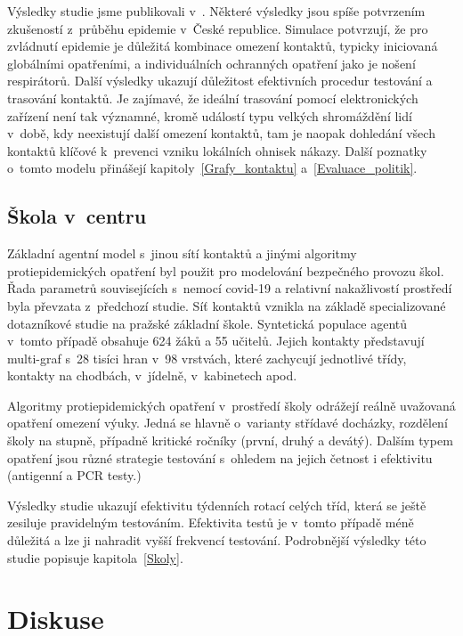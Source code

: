 Výsledky studie jsme publikovali v~\cite{M-techrep2021}. Některé výsledky jsou spíše potvrzením zkušeností z~průběhu epidemie v~České republice. Simulace potvrzují, že pro zvládnutí epidemie je důležitá kombinace omezení kontaktů, typicky iniciovaná globálními opatřeními, a individuálních ochranných opatření jako je nošení respirátorů. Další výsledky ukazují důležitost efektivních procedur testování a trasování kontaktů. Je zajímavé, že ideální trasování pomocí elektronických zařízení není tak významné, kromě událostí typu velkých shromáždění lidí v~době, kdy neexistují další omezení kontaktů, tam je naopak dohledání všech kontaktů klíčové k~prevenci vzniku lokálních ohnisek nákazy. Další poznatky o~tomto modelu přinášejí kapitoly~\ref{Grafy_kontaktu}
a~\ref{Evaluace_politik}.


\subsection*{Škola v~centru}

Základní agentní model s~jinou sítí kontaktů a jinými algoritmy protiepidemických opatření byl použit pro modelování bezpečného provozu škol. Řada parametrů souvisejících s~nemocí covid-19 a relativní nakažlivostí prostředí byla převzata z~před\-cho\-zí studie. Síť kontaktů vznikla na základě specializované dotazníkové studie na pražské základní škole. Syntetická populace agentů v~tomto případě obsahuje 624 žáků a 55 učitelů. Jejich kontakty představují multi-graf s~28 tisíci hran v~98 vrstvách, které zachycují jednotlivé třídy, kontakty na chodbách, v~jídelně, v~kabinetech apod. 

Algoritmy protiepidemických opatření v~prostředí školy odrážejí reálně uvažovaná opatření omezení výuky. Jedná se hlavně o~varianty střídavé docházky, rozdělení školy na stupně, případně kritické ročníky (první, druhý a devátý). Dalším typem opatření jsou různé strategie testování s~ohledem na jejich četnost i efektivitu (antigenní a PCR testy.)

Výsledky studie ukazují efektivitu týdenních rotací celých tříd, která se ještě zesiluje pravidelným testováním. Efektivita testů je v~tomto případě méně důležitá a lze ji nahradit vyšší frekvencí testování. Podrobnější výsledky této studie popisuje kapitola~\ref{Skoly}.







\section*{Diskuse} 

